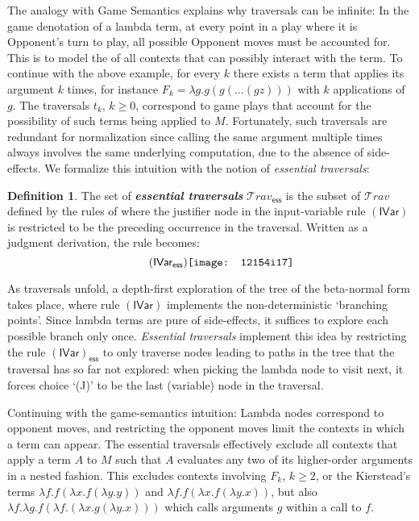 \documentclass[xchauthor,chkrefs,GCNS,amsmath,amsthm,rotating,leaveRGB]{tcsg}
\renewcommand{\index}[1]{}
\theoremstyle{plain}
\theoremstyle{definition}
\newtheorem{definition}{Definition}[section]
\newcommand\travset{\mathcal{T}\!rav}
\newcommand{\essential}{\mathsf{ess}}
\newcommand{\travsetes}{{\travset_{\essential}}}
\newcommand{\travulc}{\travset}
\newcommand{\rulefont}[1]{\mathbf{\mathsf{#1}}}
\begin{document}
The analogy with Game Semantics explains why traversals can be infinite: In
the game denotation of a lambda term, at every point in a play where it is
Opponent's turn to play, all possible Opponent moves must be accounted for.
This is to model the  of all contexts that can possibly interact
with the term. To continue with the above example, for every $k$ there exists
a term that applies its argument $k$ times, for instance $F_{k} = \lambda g .
g (g ( \ldots (g z)))$ with $k$ applications of $g$. The traversals $t_{k}$,
$k\geq 0$, correspond to game plays that account for the possibility of such
terms being applied to $M$. Fortunately, such traversals are redundant for
normalization since calling the same argument multiple times always involves
the same underlying computation, due to the absence of side-effects. We
formalize this intuition with the notion of \emph{essential traversals}:

\begin{definition}\label{def:essential_traversals}
The set of \textbf{\emph{essential traversals}}\index{essential traversals}
$\travsetes $ is the subset of $\travulc $ defined by the rules of
 where the justifier node in the
input-variable rule $\mathsf{(IVar)}$ is restricted to be the preceding
occurrence in the traversal. Written as a judgment derivation, the rule
becomes:
%
\begin{equation}
\tag{$\rulefont{IVar_{\essential} }$}
\texttt{[image: 12154i17]}
\end{equation}
\end{definition}

As traversals unfold, a depth-first exploration of the tree of the
beta-normal form takes place, where rule $\mathsf{(IVar)}$ implements the
non-deterministic `branching points'. Since lambda terms are pure of
side-effects, it suffices to explore each possible branch only once.
\emph{Essential traversals} implement this idea by restricting the rule
$\mathsf{(IVar)}_{\essential} $ to only traverse nodes leading to paths in
the tree that the traversal has so far not explored: when picking the lambda
node to visit next, it forces choice `(J)' to be the last (variable) node in
the traversal.

Continuing with the game-semantics intuition: Lambda nodes correspond to
opponent moves, and restricting the opponent moves limit the contexts in
which a term can appear. The essential traversals effectively exclude all
contexts that apply a term $A$ to $M$ such that $A$ evaluates any two of its
higher-order arguments in a nested fashion. This excludes contexts involving
$F_{k}$, $k\geq 2$, or the Kierstead's terms $\lambda f .f (\lambda x .f
(\lambda y.y))$ and $\lambda f .f (\lambda x .f (\lambda y.x))$, but also
$\lambda f. \lambda g . f (\lambda f .(\lambda x . g (\lambda y . x)))$ which
calls arguments $g$ within a call to  $f$.
\end{document}
